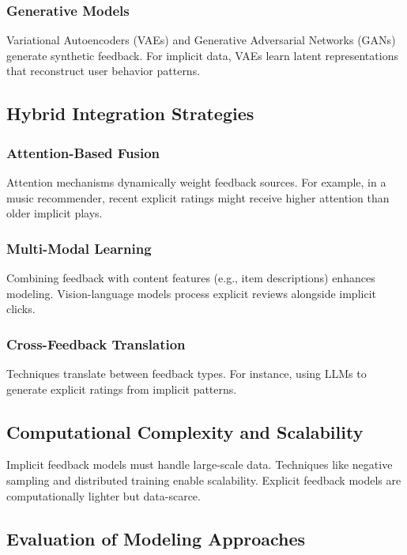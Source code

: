\documentclass[acmsmall,review,anonymous]{acmart}
\begin{document}
\subsubsection{Generative Models}

Variational Autoencoders (VAEs) and Generative Adversarial Networks (GANs) generate synthetic feedback. For implicit data, VAEs learn latent representations that reconstruct user behavior patterns.

\subsection{Hybrid Integration Strategies}

\subsubsection{Attention-Based Fusion}

Attention mechanisms dynamically weight feedback sources. For example, in a music recommender, recent explicit ratings might receive higher attention than older implicit plays.

\subsubsection{Multi-Modal Learning}

Combining feedback with content features (e.g., item descriptions) enhances modeling. Vision-language models process explicit reviews alongside implicit clicks.

\subsubsection{Cross-Feedback Translation}

Techniques translate between feedback types. For instance, using LLMs to generate explicit ratings from implicit patterns.

\subsection{Computational Complexity and Scalability}

Implicit feedback models must handle large-scale data. Techniques like negative sampling and distributed training enable scalability. Explicit feedback models are computationally lighter but data-scarce.

\subsection{Evaluation of Modeling Approaches}
\end{document}

